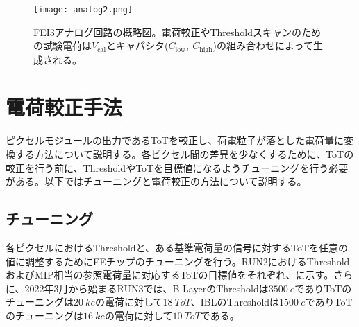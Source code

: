 \begin{figure}[tbp]
  \centering
  \texttt{[image: analog2.png]}
  \caption[FEI3アナログ回路の概略図]{FEI3アナログ回路の概略図。電荷較正やThresholdスキャンのための試験電荷は$V_\mathrm{cal}$とキャパシタ($C_\mathrm{low},\ C_\mathrm{high}$)の組み合わせによって生成される。}
  \label{fig:analog}
\end{figure}


\section{電荷較正手法}
\label{sec:calibway}
ピクセルモジュールの出力であるToTを較正し、荷電粒子が落とした電荷量に変換する方法について説明する。各ピクセル間の差異を少なくするために、ToTの較正を行う前に、ThresholdやToTを目標値になるようチューニングを行う必要がある。以下ではチューニングと電荷較正の方法について説明する。


\subsection{チューニング}
\label{sec:tuning}
各ピクセルにおけるThresholdと、ある基準電荷量の信号に対するToTを任意の値に調整するためにFEチップのチューニングを行う。RUN2におけるThresholdおよびMIP相当の参照電荷量に対応するToTの目標値をそれぞれ、に示す。さらに、2022年3月から始まるRUN3では、B-LayerのThresholdは$3500\ \si{e}$でありToTのチューニングは$20\ \si{ke}$の電荷に対して$18\ \si{ToT}$、IBLのThresholdは$1500\ \si{e}$でありToTのチューニングは$16\ \si{ke}$の電荷に対して$10\ \si{ToT}$である。

